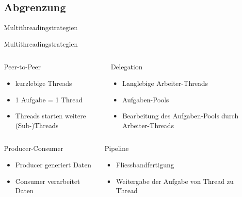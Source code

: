 \documentclass{beamer}
\begin{document}
\subsection{Abgrenzung}
\begin{frame}{Multithreadingstrategien}

Multithreadingstrategien
\begin{columns}
        \begin{block}{Peer-to-Peer}
        \begin{itemize}
            \item kurzlebige Threads
            \item 1 Aufgabe = 1 Thread
            \item Threads starten weitere (Sub-)Threads
        \end{itemize}
        \end{block}
        \begin{block}{Delegation}
        \begin{itemize}
            \item Langlebige Arbeiter-Threads
            \item Aufgaben-Pools
            \item Bearbeitung des Aufgaben-Pools durch Arbeiter-Threads
        \end{itemize}
        \end{block}
    
\end{columns}

\begin{columns}
        \begin{block}{Producer-Consumer}
        \begin{itemize}
            \item Producer generiert Daten
            \item Consumer verarbeitet Daten
        \end{itemize}
        \end{block}
        \begin{block}{Pipeline}
        \begin{itemize}
            \item Fliessbandfertigung
            \item Weitergabe der Aufgabe von Thread zu Thread
        \end{itemize}
        \end{block}
    
\end{columns}
\end{frame}
\end{document}
